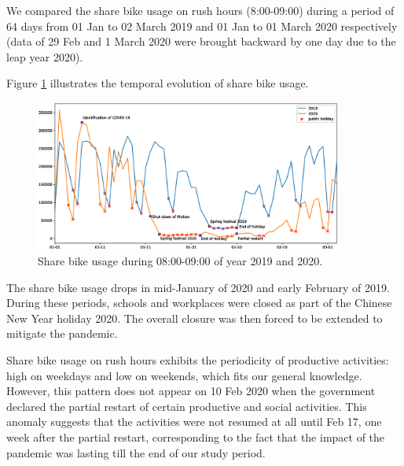 \documentclass[preprints,article,accept,moreauthors,pdftex]{Definitions/mdpi}
\begin{document}
We compared the share bike usage on rush hours (8:00-09:00) during a period of 64 days from 01 Jan to 02 March 2019 and 01 Jan to 01 March 2020 respectively (data of 29 Feb and 1 March 2020 were brought backward by one day due to the leap year 2020).


Figure \ref{fig:hour_comparison_8} %
 illustrates the temporal evolution of share bike usage.

\begin{figure}[ht]
    \centering
    \includegraphics[width=0.9\textwidth]{Figures/hour_8.eps}
    \caption{Share bike usage during 08:00-09:00 of year 2019 and 2020.}
    \label{fig:hour_comparison_8}
\end{figure}

The share bike usage drops in mid-January of 2020 and early February of 2019.
During these periods, schools and workplaces were closed as part of the Chinese New Year holiday 2020.
The overall closure was then forced to be extended to mitigate the pandemic.

Share bike usage on rush hours exhibits the periodicity of productive activities: high on weekdays and low on weekends, which fits our general knowledge.
However, this pattern does not appear on 10 Feb 2020 when the government declared the partial restart of certain productive and social activities.
This anomaly suggests that the activities were not resumed at all until Feb 17, one week after the partial restart, corresponding to the fact that the impact of the pandemic was lasting till the end of our study period.
\end{document}
